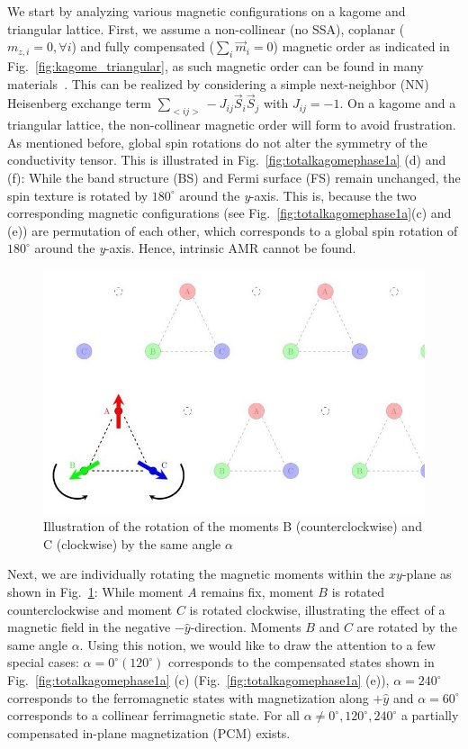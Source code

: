 \documentclass[prb,showpacs,amsmath,amssymb,superscriptaddress,twocolumn,floatfix]{revtex4-1}
\begin{document}
We start by analyzing various magnetic configurations on a kagome and triangular lattice. First, we assume a non-collinear (no SSA), coplanar ($m_{z,i} = 0, \forall i$) and fully compensated ($\sum_i \vec{m}_i = 0$) magnetic order as indicated in Fig.~\ref{fig:kagome_triangular}{\color{blue}, as such magnetic order can be found in many materials~\cite{Siddiqui:2020}}. This can be realized by considering a simple next-neighbor (NN) Heisenberg exchange term $\sum_{<ij>} -J_{ij} \vec{S}_i \vec{S}_j$ with $J_{ij} = -1$. On a kagome and a triangular lattice, the non-collinear magnetic order will form to avoid frustration. {\color{blue} As mentioned before, global spin rotations do not alter the symmetry of the conductivity tensor. This is illustrated in Fig.~\ref{fig:totalkagomephase1a} (d) and (f): While the band structure (BS) and Fermi surface (FS) remain unchanged, the spin texture is rotated by $180^\circ$ around the \textit{y}-axis. This is, because the two corresponding magnetic configurations (see Fig.~\ref{fig:totalkagomephase1a}(c) and (e)) are permutation of each other, which corresponds to a global spin rotation of $180^\circ$ around the \textit{y}-axis. Hence,} intrinsic AMR cannot be found. 


\begin{figure}
	\centering
	\includegraphics[width=0.9\linewidth]{img/kagome_rotation}
	\caption{Illustration of the rotation of the moments B (counterclockwise) and C (clockwise) by the same angle $\alpha$}
	\label{fig:kagomerotation}
\end{figure}


Next, we are individually rotating the magnetic moments
within the $xy$-plane as shown in Fig.~\ref{fig:kagomerotation}: While moment $A$ remains fix, moment $B$ is rotated counterclockwise and moment $C$ is rotated clockwise, illustrating the effect of a magnetic field in the negative $-\hat{y}$-direction. Moments $B$ and $C$ are rotated by the same angle $\alpha$. Using this notion, we would like to draw the attention to a few special cases: $\alpha = 0^\circ (120^\circ)$ corresponds to the compensated states shown in Fig.~\ref{fig:totalkagomephase1a} (c) (Fig.~\ref{fig:totalkagomephase1a} (e)), $\alpha = 240^\circ$ corresponds to the ferromagnetic states with magnetization along $+\hat{y}$ and $\alpha = 60^\circ$ corresponds to a collinear ferrimagnetic state. For all $\alpha \neq 0^\circ, 120^\circ, 240^\circ$ a partially compensated in-plane magnetization {\color{blue} (PCM)} exists. 
\end{document}
